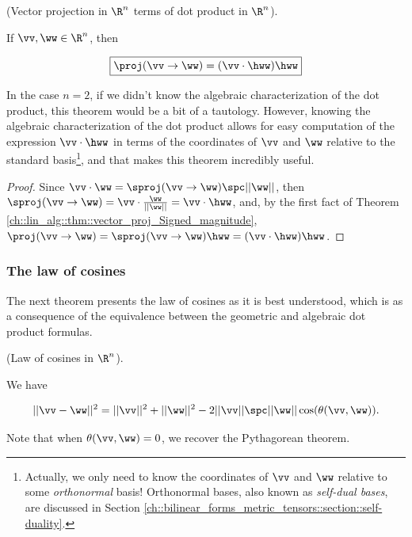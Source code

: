 \begin{theorem}
\label{ch::lin_alg::thm::vector_proj_dot_product}
    (Vector projection in $\R^n$ terms of dot product in $\R^n$).
    
    If $\vv, \ww \in \R^n$, then
    
    \begin{align*}
        \boxed
        {
            \proj(\vv \rightarrow \ww) = (\vv \cdot \hww) \hww
        }
    \end{align*}
    
    In the case $n = 2$, if we didn't know the algebraic characterization of the dot product, this theorem would be a bit of a tautology. However, knowing the algebraic characterization of the dot product allows for easy computation of the expression $\vv \cdot \hww$ in terms of the coordinates of $\vv$ and $\ww$ relative to the standard basis\footnote{Actually, we only need to know the coordinates of $\vv$ and $\ww$ relative to some \textit{orthonormal} basis! Orthonormal bases, also known as \textit{self-dual bases}, are discussed in Section \ref{ch::bilinear_forms_metric_tensors::section::self-duality}.}, and that makes this theorem incredibly useful.
\end{theorem}

\begin{proof}
   Since $\vv \cdot \ww = \sproj(\vv \rightarrow \ww) \spc ||\ww||$, then $\sproj(\vv \rightarrow \ww) = \vv \cdot \frac{\ww}{||\ww||} = \vv \cdot \hww$, and, by the first fact of Theorem \ref{ch::lin_alg::thm::vector_proj_Signed_magnitude}, $\proj(\vv \rightarrow \ww) = \sproj(\vv \rightarrow \ww) \hww = (\vv \cdot \hww) \hww$.
\end{proof}

\subsubsection*{The law of cosines}

The next theorem presents the law of cosines as it is best understood, which is as a consequence of the equivalence between the geometric and algebraic dot product formulas.

\begin{theorem}
\label{ch::lin_alg::thm::law_of_cosines}
    (Law of cosines in $\R^n$). 
    
    We have

    \begin{align*}
        ||\vv - \ww||^2 = ||\vv||^2 + ||\ww||^2 - 2 ||\vv|| \spc ||\ww|| \cos(\theta(\vv, \ww)).
    \end{align*}
    
    Note that when $\theta(\vv, \ww) = 0$, we recover the Pythagorean theorem.
\end{theorem}

